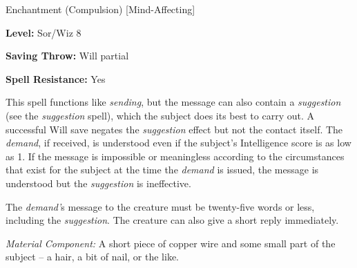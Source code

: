 
Enchantment (Compulsion) [Mind-Affecting]

\textbf{Level:} Sor/Wiz 8

\textbf{Saving Throw:} Will partial

\textbf{Spell Resistance:} Yes

This spell functions like \textit{sending}, but the message can also contain a 
\textit{suggestion} (see the \textit{suggestion} spell), which the subject does 
its best to carry out. A successful Will save negates the \textit{suggestion} effect 
but not the contact itself. The \textit{demand}, if received, is understood even 
if the subject's Intelligence score is as low as 1. If the message is impossible 
or meaningless according to the circumstances that exist for the subject at the 
time the \textit{demand} is issued, the message is understood but the \textit{suggestion 
}is ineffective.

The \textit{demand'}s message to the creature must be twenty-five words or less, 
including the \textit{suggestion}. The creature can also give a short reply immediately.

\textit{Material Component:} A short piece of copper wire and some small part of 
the subject -- a hair, a bit of nail, or the like.

